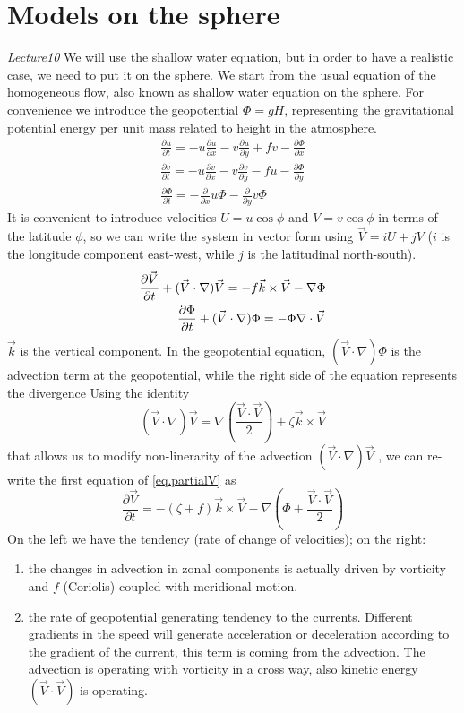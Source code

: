 \section{Models on the sphere}\label{Sec:models on the sphere} \textit{Lecture10}
We will use the shallow water equation, but in order to have a realistic case, we need to put it on the sphere. We start from the usual equation of the homogeneous flow, also known as shallow water equation on the sphere. For convenience we introduce the geopotential $\Phi= gH$, representing the gravitational potential energy per unit mass related to height in the atmosphere.
\begin{align}
	\frac{\partial u}{\partial t}=-u\frac{\partial u}{\partial x}-v\frac{\partial u}{\partial y}+fv-\frac{\partial\Phi}{\partial x} \\
	\frac{\partial v}{\partial t}=-u\frac{\partial v}{\partial x}-v\frac{\partial v}{\partial y}-fu-\frac{\partial\Phi}{\partial y} \\
	\frac{\partial\Phi}{\partial t}=-\frac{\partial}{\partial x}u\Phi-\frac{\partial}{\partial y}v\Phi
\end{align}
It is convenient to introduce velocities $U=u\cos\phi$ and $V=v\cos\phi$ in terms of the latitude $\phi$, so we can write the system in vector form using $\vec{V}=iU+jV$ ($i$ is the longitude component east-west, while $j$ is the latitudinal north-south).
\begin{align}\label{eq.partialV}
	\frac{\partial\vec{V}}{\partial t}+(\vec{V}\cdot\nabla)\vec{V}=-f\vec{k}\times\vec{V}-\nabla\Phi \\
	\frac{\partial\Phi}{\partial t}+(\vec{V}\cdot\nabla)\Phi=-\Phi\nabla\cdot\vec{V}\notag
\end{align}
$\vec{k}$ is the vertical component. In the geopotential equation, $(\vec{V}\cdot\nabla)\Phi$ is the advection term at the geopotential, while the right side of the equation represents the divergence
Using the identity
$$(\vec{V}\cdot\nabla)\vec{V}=\nabla\left(\frac{\vec{V}\cdot\vec{V}}{2}\right)+\zeta\vec{k}\times\vec{V}$$
that allows us to modify non-linerarity of the advection $(\vec{V}\cdot\nabla)\vec{V}$ , we can re-write the first equation of \ref{eq.partialV} as
\begin{equation}\label{eq.V}
	\frac{\partial\vec{V}}{\partial t}=-(\zeta+f)\vec{k}\times\vec{V}-\nabla\left(\Phi+\frac{\vec{V}\cdot\vec{V}}{2}\right)
\end{equation}
On the left we have the tendency (rate of change of velocities); on the right:
\begin{enumerate}
	\item the changes in advection in zonal components is actually driven by vorticity and $f$ (Coriolis) coupled with meridional motion.
	\item the rate of geopotential generating tendency to the currents. Different gradients in the speed will generate acceleration or deceleration according to the gradient of the current, this term is coming from the advection. The advection is operating with vorticity in a cross way, also kinetic energy $(\vec{V}\cdot\vec{V})$ is operating.
\end{enumerate}


